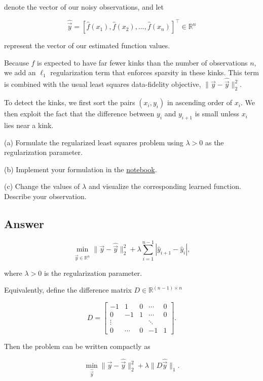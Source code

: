 \documentclass[
	12pt,
]{fphw}
\begin{document}
denote the vector of our noisy observations, and let

\[
\hat{\vec{y}} = [\hat{f}(x_1), \hat{f}(x_2), ..., \hat{f}(x_n)]^\top \in \mathbb{R}^n
\]

represent the vector of our estimated function values.

Because \(f\) is expected to have far fewer kinks than the number of observations \(n\), we add an \(\ell_1\) regularization term that enforces sparsity in these kinks. This term is combined with the usual least squares data-fidelity objective, \(\|\vec{y} - \hat{\vec{y}}\|_2^2\).

To detect the kinks, we first sort the pairs \((x_i, y_i)\) in ascending order of \(x_i\). We then exploit the fact that the difference between \(y_i\) and \(y_{i+1}\) is small unless \(x_i\) lies near a kink.

(a) Formulate the regularized least squares problem using \(\lambda > 0\) as the regularization parameter.

(b) Implement your formulation in the \href{https://colab.research.google.com/drive/1-dB40hqyIXesv8OLQ93Cc19wplziyaVA?usp=sharing}{notebook}.

(c) Change the values of \(\lambda\) and visualize the corresponding learned function. Describe your observation.

\subsection*{Answer}

\[
\min_{\hat{\vec y} \in \mathbb{R}^n}
\|\vec y - \hat{\vec y}\|_2^2
+
\lambda
\sum_{i=1}^{n-1}
|\hat y_{i+1} - \hat y_i|,
\]

where $\lambda > 0$ is the regularization parameter.

Equivalently, define the difference matrix $D \in \mathbb{R}^{(n-1)\times n}$

\[
D =
\begin{bmatrix}
-1 & 1 & 0 & \cdots & 0 \\
0 & -1 & 1 & \cdots & 0 \\
\vdots & & & \ddots & \\
0 & \cdots & 0 & -1 & 1
\end{bmatrix}.
\]

Then the problem can be written compactly as

\[
\min_{\hat{\vec y}}
\|\vec y - \hat{\vec y}\|_2^2 + \lambda \|D\hat{\vec y}\|_1 .
\]
\end{document}
